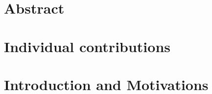 \documentclass[11pt]{article}
\begin{document}



\tableofcontents

\newpage




\section{Abstract}

\section{Individual contributions}

\section{Introduction and Motivations}
\end{document}
